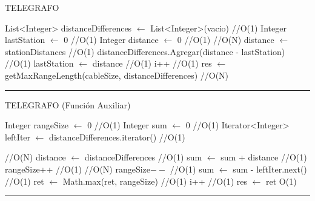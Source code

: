 
\begin{algorithm}[H]
\caption{TELEGRAFO}
\begin{algorithmic}[1]
\state List<Integer> distanceDifferences $\gets$ List<Integer>(vacio) \hfill //O(1)
\state Integer lastStation $\gets$ 0 \hfill //O(1)
\state Integer distance $\gets$ 0 \hfill //O(1)
 \hfill //O(N)
\state distance $\gets$ stationDistances \hfill //O(1)
\state distanceDifferences.Agregar(distance - lastStation) \hfill //O(1)
\state lastStation $\gets$ distance \hfill //O(1)
\state i++ \hfill //O(1)
\endwhile
\state res $\gets$ getMaxRangeLength(cableSize, distanceDifferences) \hfill //O(N)
\EndFunction 
\end{algorithmic}
\hrule
{}
\end{algorithm}

\begin{algorithm}[H]
\caption{TELEGRAFO (Funci\'on Auxiliar)}
\begin{algorithmic}[1]
\state Integer rangeSize $\gets$ 0 \hfill //O(1)
\state Integer sum $\gets$ 0 \hfill //O(1)
\state Iterator<Integer> leftIter $\gets$ distanceDifferences.iterator() \hfill //O(1)

 \hfill //O(N)
\state distance $\gets$ distanceDifferences \hfill //O(1)
\state sum $\gets$ sum + distance \hfill //O(1)
\state rangeSize++ \hfill //O(1)
        \hfill //O(N)
\state rangeSize$--$ \hfill //O(1)
\state sum $\gets$ sum - leftIter.next() \hfill //O(1)
\endwhile
\state ret $\gets$ Math.max(ret, rangeSize) \hfill //O(1)
\state i++ \hfill //O(1)
\endwhile
\state res $\gets$ ret \hfill O(1)
\EndFunction 
\end{algorithmic}
\hrule
{}
\end{algorithm}